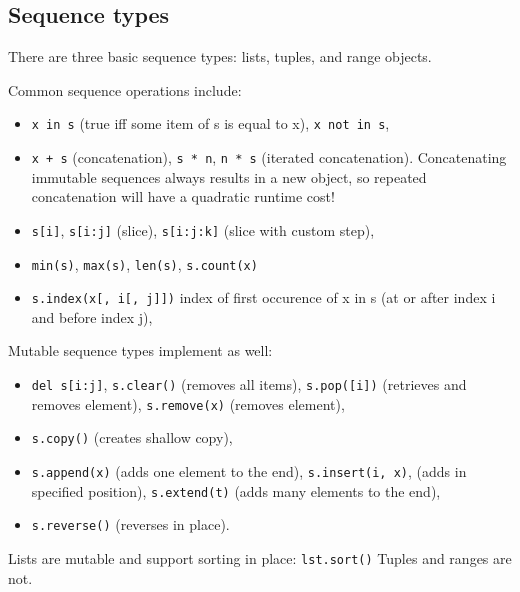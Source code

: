 \subsection{Sequence types}
There are three basic sequence types: lists, tuples, and range objects.

Common sequence operations include:
\begin{itemize}
    \item
    \texttt{x in s} (true iff some item of s is equal to x),
    \texttt{x not in s},

    \item
    \texttt{x + s} (concatenation),
    \texttt{s * n},
    \texttt{n * s} (iterated concatenation).
    Concatenating immutable sequences always results in a new object, so repeated concatenation will have a quadratic runtime cost!

    \item
    \texttt{s[i]},
    \texttt{s[i:j]} (slice),
    \texttt{s[i:j:k]} (slice with custom step),

    \item
    \texttt{min(s)},
    \texttt{max(s)},
    \texttt{len(s)},
    \texttt{s.count(x)}

    \item
    \texttt{s.index(x[, i[, j]])} index of first occurence of x in s (at or after index i and before index j),
\end{itemize}

Mutable sequence types implement as well:
\begin{itemize}
    \item
    \texttt{del s[i:j]},
    \texttt{s.clear()} (removes all items),
    \texttt{s.pop([i])} (retrieves and removes element),
    \texttt{s.remove(x)} (removes element),

    \item
    \texttt{s.copy()} (creates shallow copy),

    \item
    \texttt{s.append(x)} (adds one element to the end),
    \texttt{s.insert(i, x)}, (adds in specified position),
    \texttt{s.extend(t)} (adds many elements to the end),

    \item
    \texttt{s.reverse()} (reverses in place).
\end{itemize}

Lists are mutable and support sorting in place: \texttt{lst.sort()}
Tuples and ranges are not.

%